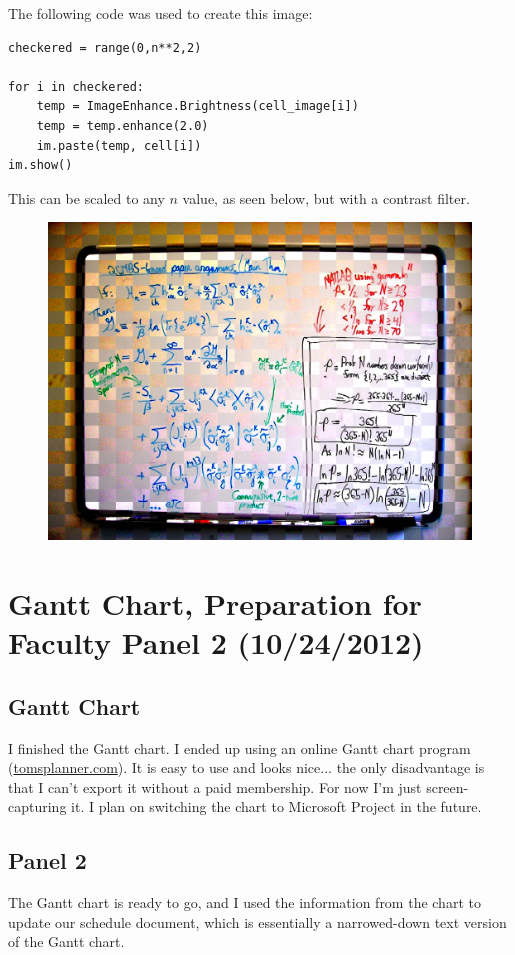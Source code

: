 \documentclass[]{article}
\begin{document}
The following code was used to create this image: 
\begin{verbatim}
checkered = range(0,n**2,2)

for i in checkered:
    temp = ImageEnhance.Brightness(cell_image[i])
    temp = temp.enhance(2.0)
    im.paste(temp, cell[i])
im.show()
\end{verbatim}

This can be scaled to any $n$ value, as seen below, but with a contrast filter.

\begin{figure}[H]
\centering
\includegraphics[scale=0.15]{images/cell_contrast_25}
\end{figure}


	\section{Gantt Chart, Preparation for Faculty Panel 2 (10/24/2012)}
		\subsection*{Gantt Chart}
	I finished the Gantt chart.  I ended up using an online Gantt chart program (\url{tomsplanner.com}).  It is easy to use and looks nice... the only disadvantage is that I can't export it without a paid membership.  For now I'm just screen-capturing it.  I plan on switching the chart to Microsoft Project in the future.
		\subsection*{Panel 2}
	The Gantt chart is ready to go, and I used the information from the chart to update our schedule document, which is essentially a narrowed-down text version of the Gantt chart.  
	
\end{document}

